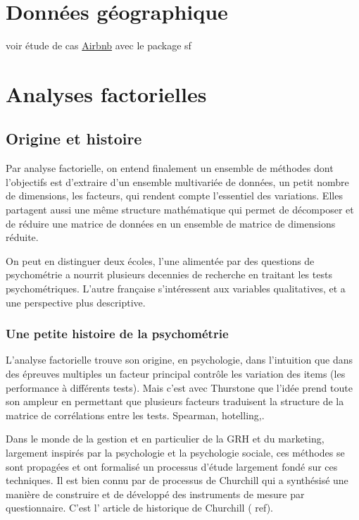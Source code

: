 \documentclass[
]{book}
\begin{document}
\hypertarget{donnuxe9es-guxe9ographique}{%
\chapter{Données géographique}\label{donnuxe9es-guxe9ographique}}

voir étude de cas \href{http://r.benavent.fr/map.html}{Airbnb} avec le package sf

\hypertarget{analyses-factorielles}{%
\chapter{Analyses factorielles}\label{analyses-factorielles}}

\hypertarget{origine-et-histoire}{%
\section{Origine et histoire}\label{origine-et-histoire}}

Par analyse factorielle, on entend finalement un ensemble de méthodes dont l'objectifs est d'extraire d'un ensemble multivariée de données, un petit nombre de dimensions, les facteurs, qui rendent compte l'essentiel des variations. Elles partagent aussi une même structure mathématique qui permet de décomposer et de réduire une matrice de données en un ensemble de matrice de dimensions réduite.

On peut en distinguer deux écoles, l'une alimentée par des questions de psychométrie a nourrit plusieurs decennies de recherche en traitant les tests psychométriques. L'autre française s'intéressent aux variables qualitatives, et a une perspective plus descriptive.

\hypertarget{une-petite-histoire-de-la-psychomuxe9trie}{%
\subsection{Une petite histoire de la psychométrie}\label{une-petite-histoire-de-la-psychomuxe9trie}}

L'analyse factorielle trouve son origine, en psychologie, dans l'intuition que dans des épreuves multiples un facteur principal contrôle les variation des items (les performance à différents tests). Mais c'est avec Thurstone \citet{thurstone_multiple_1931} que l'idée prend toute son ampleur en permettant que plusieurs facteurs traduisent la structure de la matrice de corrélations entre les tests. Spearman, hotelling,.

Dans le monde de la gestion et en particulier de la GRH et du marketing, largement inspirés par la psychologie et la psychologie sociale, ces méthodes se sont propagées et ont formalisé un processus d'étude largement fondé sur ces techniques. Il est bien connu par de processus de Churchill qui a synthésisé une manière de construire et de développé des instruments de mesure par questionnaire. C'est l' article de historique de Churchill ( ref).
\end{document}
